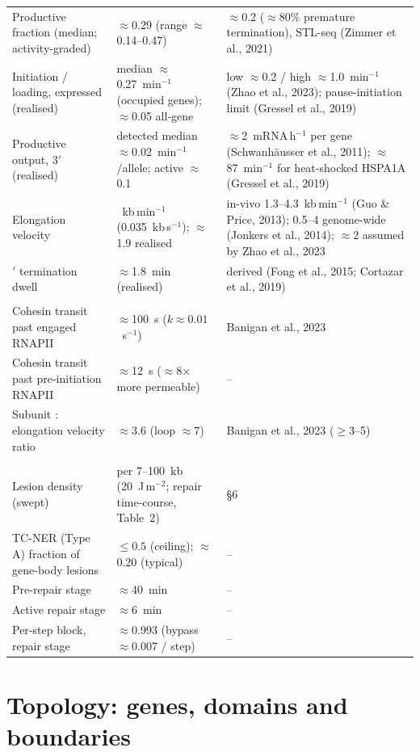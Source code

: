 \documentclass[11pt]{article}
\begin{document}
\begin{longtable}{@{}>{\raggedright\arraybackslash}p{3.7cm} >{\raggedright\arraybackslash}p{3.4cm} >{\raggedright\arraybackslash}p{7.3cm}@{}}
Productive fraction (median; activity-graded) & $\approx$0.29 (range $\approx$0.14--0.47) & $\approx$0.2 ($\approx$80\% premature termination), STL-seq (Zimmer et al., 2021) \\
Initiation / loading, expressed (realised) & median $\approx$0.27~min$^{-1}$ (occupied genes); $\approx$0.05 all-gene & low $\approx$0.2 / high $\approx$1.0~min$^{-1}$ (Zhao et al., 2023); pause-initiation limit (Gressel et al., 2019) \\
Productive output, 3$'$ (realised) & detected median $\approx$0.02~min$^{-1}$/allele; active $\approx$0.1 & $\approx$2~mRNA\,h$^{-1}$ per gene (Schwanh\"ausser et al., 2011); $\approx$87~min$^{-1}$ for heat-shocked HSPA1A (Gressel et al., 2019) \\
Elongation velocity & 2.1~kb\,min$^{-1}$ (0.035~kb\,s$^{-1}$); $\approx$1.9 realised & in-vivo 1.3--4.3~kb\,min$^{-1}$ (Guo \& Price, 2013); 0.5--4 genome-wide (Jonkers et al., 2014); $\approx$2 assumed by Zhao et al., 2023 \\
3$'$ termination dwell & $\approx$1.8~min (realised) & derived (Fong et al., 2015; Cortazar et al., 2019) \\
\addlinespace
\multicolumn{3}{@{}l}{\textit{RNAPII -- cohesin}}\\
Cohesin transit past engaged RNAPII & $\approx$100~s ($k \approx 0.01$~s$^{-1}$) & Banigan et al., 2023 \\
Cohesin transit past pre-initiation RNAPII & $\approx$12~s ($\approx$8$\times$ more permeable) & -- \\
Subunit : elongation velocity ratio & $\approx$3.6 (loop $\approx$7) & Banigan et al., 2023 ($\ge$3--5) \\
\addlinespace
\multicolumn{3}{@{}l}{\textit{Lesions and repair}}\\
Lesion density (swept) & 1 per 7--100~kb (20~J\,m$^{-2}$; repair time-course, Table~2) & \S6 \\
TC-NER (Type A) fraction of gene-body lesions & $\le 0.5$ (ceiling); $\approx$0.20 (typical) & -- \\
Pre-repair stage & $\approx$40~min & -- \\
Active repair stage & $\approx$6~min & -- \\
Per-step block, repair stage & $\approx$0.993 (bypass $\approx$0.007 / step) & -- \\
\end{longtable}

\section{Topology: genes, domains and boundaries}
\end{document}
